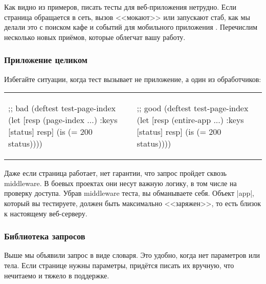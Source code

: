 
Как видно из примеров, писать тесты для веб-приложения нетрудно. Если страница
обращается в сеть, вызов <<мокают>> или запускают стаб, как мы делали это с
поиском кафе и событий для мобильного приложения .
Перечислим несколько новых приёмов, которые облегчат вашу работу.

\subsubsection*{Приложение целиком}

Избегайте ситуации, когда тест вызывает не приложение, а один из
обработчиков:

\noindent
\begin{tabular}{ @{}p{5.5cm} @{}p{5.2cm} }

\begin{english}
  \begin{clojure}
;; bad
(deftest test-page-index
  (let [resp (page-index {...})
        {:keys [status]} resp]
    (is (= 200 status))))
  \end{clojure}
\end{english}

&

\begin{english}
  \begin{clojure}
;; good
(deftest test-page-index
  (let [resp (entire-app {...})
        {:keys [status]} resp]
    (is (= 200 status))))
  \end{clojure}
\end{english}

\end{tabular}

Даже если страница работает, нет гарантии, что запрос пройдет сквозь
middleware. В боевых проектах они несут важную логику, в том числе на проверку
доступа. Убрав middleware теста, вы обманываете себя. Объект \spverb|app|,
который вы тестируете, должен быть максимально <<заряжен>>, то есть близок к
настоящему веб-серверу.

\subsubsection*{Библиотека запросов}

Выше мы объявили запрос в виде словаря. Это удобно, когда нет параметров или
тела. Если странице нужны параметры, придётся писать их вручную, что нечитаемо и
тяжело в поддержке.

